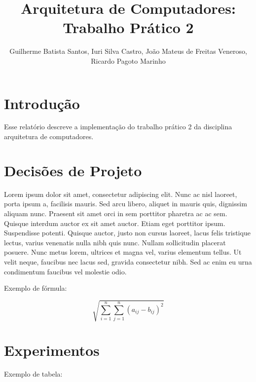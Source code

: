 \documentclass{article}
\begin{document}
\title{Arquitetura de Computadores: Trabalho Prático 2}
\author{Guilherme Batista Santos, Iuri Silva Castro, João Mateus de Freitas Veneroso, Ricardo Pagoto Marinho}

\maketitle

\section{Introdução}

Esse relatório descreve a implementação do trabalho prático 2 da disciplina arquitetura de computadores. 

\section{Decisões de Projeto}

Lorem ipsum dolor sit amet, consectetur adipiscing elit. Nunc ac nisl laoreet, porta ipsum a, facilisis mauris. Sed arcu libero, aliquet in mauris quis, dignissim aliquam nunc. Praesent sit amet orci in sem porttitor pharetra ac ac sem. Quisque interdum auctor ex sit amet auctor. Etiam eget porttitor ipsum. Suspendisse potenti. Quisque auctor, justo non cursus laoreet, lacus felis tristique lectus, varius venenatis nulla nibh quis nunc. Nullam sollicitudin placerat posuere. Nunc metus lorem, ultrices et magna vel, varius elementum tellus. Ut velit neque, faucibus nec lacus sed, gravida consectetur nibh. Sed ac enim eu urna condimentum faucibus vel molestie odio.

Exemplo de fórmula:

\[
\sqrt{\sum_{i = 1}^n\sum_{j = 1}^n (a_{ij} - b_{ij})^2}
\]

\section{Experimentos}

Exemplo de tabela:
\end{document}
